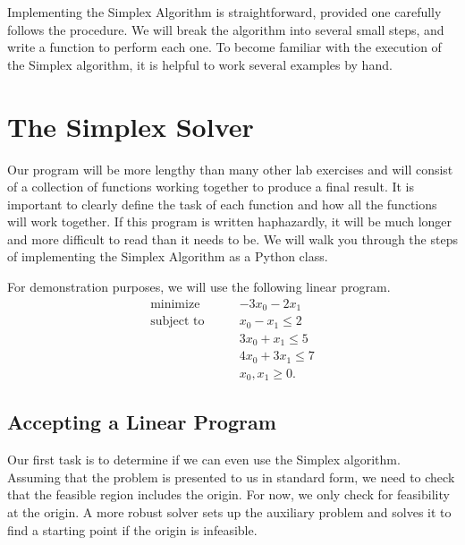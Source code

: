 


Implementing the Simplex Algorithm is straightforward, provided one carefully follows the procedure.
We will break the algorithm into several small steps, and write a function to perform each one.
To become familiar with the execution of the Simplex algorithm, it is helpful to work several examples by hand.

\section*{The Simplex Solver} %

Our program will be more lengthy than many other lab exercises and will consist of a collection of functions working together to produce a final result.
It is important to clearly define the task of each function and how all the functions will work together.
If this program is written haphazardly, it will be much longer and more difficult to read than it needs to be.
We will walk you through the steps of implementing the Simplex Algorithm as a Python class.

For demonstration purposes, we will use the following linear program.
\begin{align*}
\text{minimize}\qquad & -3x_0 - 2x_1 \\
\text{subject to}\qquad
& x_0 - x_1 \leq 2 \\
& 3x_0 + x_1 \leq 5 \\
& 4x_0 + 3x_1 \leq 7 \\
& x_0, x_1 \geq 0.
\end{align*}

\subsection*{Accepting a Linear Program} %

Our first task is to determine if we can even use the Simplex algorithm.
Assuming that the problem is presented to us in standard form, we need to check that the feasible region includes the origin.  For now, we only check for feasibility at the origin. A more robust solver sets up the auxiliary problem and solves it to find a starting point if the origin is infeasible.

